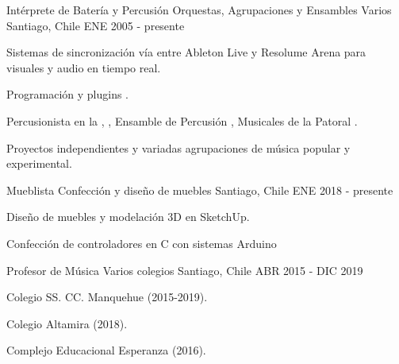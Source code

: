 \begin{cventries}
  \cventry
    {Intérprete de Batería y Percusión}
    {Orquestas, Agrupaciones y Ensambles Varios}
    {Santiago, Chile}
    {ENE 2005 - presente}
    {
    	\begin{cvitems} %
    	  \item {Sistemas de sincronización  vía  entre Ableton Live y Resolume Arena para visuales y audio  en tiempo real.}
    	  \item {Programación  y plugins .}
        \item {Percusionista en la , , Ensamble de Percusión , Musicales de la Patoral .}
        \item {Proyectos independientes y variadas agrupaciones de música popular y experimental.}
      \end{cvitems}
		}

  \cventry
    {Mueblista} %
    {Confección y diseño de muebles} %
    {Santiago, Chile} %
    {ENE 2018 - presente} %
    {
      \begin{cvitems} %
        \item {Diseño de muebles y modelación 3D en SketchUp.}
        \item {Confección de controladores  en C con sistemas Arduino}
      \end{cvitems}
    }

  \cventry
    {Profesor de Música} %
    {Varios colegios} %
    {Santiago, Chile} %
    {ABR 2015 - DIC 2019} %
    {
      \begin{cvitems} %
        \item {Colegio SS. CC. Manquehue (2015-2019).}
        \item {Colegio Altamira (2018).}
        \item {Complejo Educacional Esperanza (2016).}
      \end{cvitems}
    }

\end{cventries}
